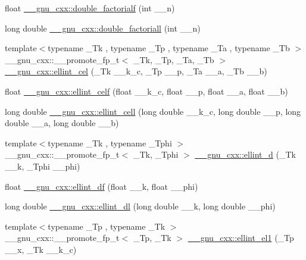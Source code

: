 \begin{DoxyCompactItemize}
\item 
float \hyperlink{group__gnu__math__spec__func_ga85ec284e603f32d18970bbdbb12d5150}{\+\_\+\+\_\+gnu\+\_\+cxx\+::double\+\_\+factorialf} (int \+\_\+\+\_\+n)
\item 
long double \hyperlink{group__gnu__math__spec__func_ga0366730a4a775256217ef1cd9d0c3a04}{\+\_\+\+\_\+gnu\+\_\+cxx\+::double\+\_\+factoriall} (int \+\_\+\+\_\+n)
\item 
{\footnotesize template$<$typename \+\_\+\+Tk , typename \+\_\+\+Tp , typename \+\_\+\+Ta , typename \+\_\+\+Tb $>$ }\\\+\_\+\+\_\+gnu\+\_\+cxx\+::\+\_\+\+\_\+promote\+\_\+fp\+\_\+t$<$ \+\_\+\+Tk, \+\_\+\+Tp, \+\_\+\+Ta, \+\_\+\+Tb $>$ \hyperlink{group__gnu__math__spec__func_ga45ad61f29827bcf27d05ead27490fe84}{\+\_\+\+\_\+gnu\+\_\+cxx\+::ellint\+\_\+cel} (\+\_\+\+Tk \+\_\+\+\_\+k\+\_\+c, \+\_\+\+Tp \+\_\+\+\_\+p, \+\_\+\+Ta \+\_\+\+\_\+a, \+\_\+\+Tb \+\_\+\+\_\+b)
\item 
float \hyperlink{group__gnu__math__spec__func_ga6d8fbef7853cf37de11278b1ff7127e8}{\+\_\+\+\_\+gnu\+\_\+cxx\+::ellint\+\_\+celf} (float \+\_\+\+\_\+k\+\_\+c, float \+\_\+\+\_\+p, float \+\_\+\+\_\+a, float \+\_\+\+\_\+b)
\item 
long double \hyperlink{group__gnu__math__spec__func_gaa5add699fb2b4b02e63f8725a3a79750}{\+\_\+\+\_\+gnu\+\_\+cxx\+::ellint\+\_\+cell} (long double \+\_\+\+\_\+k\+\_\+c, long double \+\_\+\+\_\+p, long double \+\_\+\+\_\+a, long double \+\_\+\+\_\+b)
\item 
{\footnotesize template$<$typename \+\_\+\+Tk , typename \+\_\+\+Tphi $>$ }\\\+\_\+\+\_\+gnu\+\_\+cxx\+::\+\_\+\+\_\+promote\+\_\+fp\+\_\+t$<$ \+\_\+\+Tk, \+\_\+\+Tphi $>$ \hyperlink{group__gnu__math__spec__func_ga71785ba6bad83f009cb2dc4d2d574194}{\+\_\+\+\_\+gnu\+\_\+cxx\+::ellint\+\_\+d} (\+\_\+\+Tk \+\_\+\+\_\+k, \+\_\+\+Tphi \+\_\+\+\_\+phi)
\item 
float \hyperlink{group__gnu__math__spec__func_ga02ed50be21fdd84ad6bed003f94a9e69}{\+\_\+\+\_\+gnu\+\_\+cxx\+::ellint\+\_\+df} (float \+\_\+\+\_\+k, float \+\_\+\+\_\+phi)
\item 
long double \hyperlink{group__gnu__math__spec__func_gaa34bcb8e316f2e8b2b2bf48cd89abd98}{\+\_\+\+\_\+gnu\+\_\+cxx\+::ellint\+\_\+dl} (long double \+\_\+\+\_\+k, long double \+\_\+\+\_\+phi)
\item 
{\footnotesize template$<$typename \+\_\+\+Tp , typename \+\_\+\+Tk $>$ }\\\+\_\+\+\_\+gnu\+\_\+cxx\+::\+\_\+\+\_\+promote\+\_\+fp\+\_\+t$<$ \+\_\+\+Tp, \+\_\+\+Tk $>$ \hyperlink{group__gnu__math__spec__func_gac012a02a3d206b2f2a0638ffd3693b83}{\+\_\+\+\_\+gnu\+\_\+cxx\+::ellint\+\_\+el1} (\+\_\+\+Tp \+\_\+\+\_\+x, \+\_\+\+Tk \+\_\+\+\_\+k\+\_\+c)

\end{DoxyCompactItemize}
